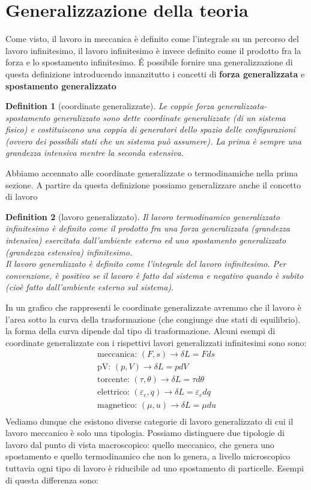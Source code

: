 \documentclass[10pt,a4paper]{article}
\newtheorem{definition}{Definition}
\begin{document}
\section{Generalizzazione della teoria}
Come visto, il lavoro in meccanica è definito come l'integrale su un percorso del lavoro infinitesimo, il lavoro infinitesimo è invece definito come il prodotto fra la forza e lo spostamento infinitesimo. \'{E} possibile fornire una generalizzazione di questa definizione introducendo innanzitutto i concetti di \textbf{forza generalizzata} e \textbf{spostamento generalizzato}
\begin{definition}[coordinate generalizzate]
	Le coppie forza generalizzata-spostamento generalizzato sono dette coordinate generalizzate (di un sistema fisico) e costituiscono una coppia di generatori dello spazio delle configurazioni (ovvero dei possibili stati che un sistema può assumere). La prima è sempre una grandezza intensiva mentre la seconda estensiva.
\end{definition}
Abbiamo accennato alle coordinate generalizzate o termodinamiche nella prima sezione. A partire da questa definizione possiamo generalizzare anche il concetto di lavoro
\begin{definition}[lavoro generalizzato]
	Il lavoro termodinamico generalizzato infinitesimo è definito come il prodotto fra una forza generalizzata (grandezza intensiva) esercitata dall'ambiente esterno ed uno spostamento generalizzato (grandezza estensiva) infinitesimo.\\
	Il lavoro generalizzato è definito come l'integrale del lavoro infinitesimo. 
	Per convenzione, è positivo se il lavoro è fatto dal sistema e negativo quando è subito (cioè fatto dall'ambiente esterno sul sistema). 
\end{definition}
In un grafico che rappresenti le coordinate generalizzate avremmo che il lavoro è l'area sotto la curva della trasformazione (che congiunge due stati di equilibrio). la forma della curva dipende dal tipo di trasformazione.  
Alcuni esempi di coordinate generalizzate con i rispettivi lavori generalizzati infinitesimi sono sono:
\begin{align*} 
	\text{meccanica: }(F, s)\rightarrow\delta L = F ds\\ 
	\text{pV: }(p, V)\rightarrow\delta L=p dV\\
	\text{torcente: }(\tau, \theta)\rightarrow\delta L=\tau d\theta\\
	\text{elettrico: }(\varepsilon_e, q)\rightarrow\delta L=\varepsilon_edq\\
	\text{magnetico: }(\mu, u)\rightarrow\delta L=\mu du\\
\end{align*} 
Vediamo dunque che esistono diverse categorie di lavoro generalizzato di cui il lavoro meccanico è solo una tipologia. Possiamo distinguere due tipologie di lavoro dal punto di vista macroscopico: quello meccanico, che genera uno spostamento e quello termodinamico che non lo genera, a livello microscopico tuttavia ogni tipo di lavoro è riducibile ad uno spostamento di particelle. Esempi di questa differenza sono:
\end{document}
